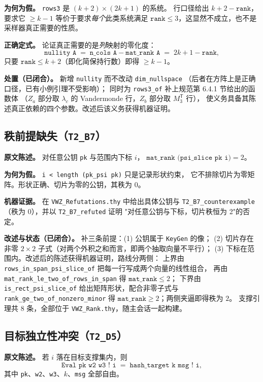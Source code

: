 \documentclass[UTF8,fontset=windows,zihao=-4,a4paper]{ctexart}
\newcommand{\code}[1]{\texttt{#1}}
\begin{document}
\textbf{为何为假。} \code{rows3} 是 $(k+2)\times(2k+1)$ 的系统。
行口径给出 $k+2-\code{rank}$，要求它 $\ge k-1$ 等价于要求\emph{每个}此类系统满足
$\code{rank} \le 3$，这显然不成立，也不是采样器真正需要的性质。

\textbf{正确定式。} 论证真正需要的是\emph{列}映射的零化度：
\begin{equation*}
  \code{nullity A} \;=\; \code{n\_cols A} - \code{mat\_rank A} \;=\; 2k+1-\code{rank},
\end{equation*}
只要 $\code{rank} \le k+2$（即化简保持行数）即得 $\ge k-1$。

\textbf{处置（已闭合）。} 新增 \code{nullity} 而不改动 \code{dim\_nullspace}
（后者在方阵上是正确口径，已有小例引理不受影响）；
同时为 \code{rows3\_of} 补上规范第 6.4.1 节给出的函数体
（$Z_a$ 部分取 $\lambda_c$ 的 Vandermonde 行，$Z_b$ 部分取 $M_3^{\mathsf T}$ 行），
使义务具备其陈述真正依赖的四个参数。改述后该义务获得机器证明。

\subsection{秩前提缺失（\code{T2\_B7}）}
\textbf{原文陈述。} 对任意公钥 \code{pk} 与范围内下标 $i$，
$\code{mat\_rank (psi\_slice pk i)} = 2$。

\textbf{为何为假。} \code{i < length (pk\_psi pk)} 只是记录形状约束，
它不排除切片为零矩阵。形状正确、切片为零的公钥，其秩为 $0$。

\textbf{机器证据。} 在 \code{VWZ\_Refutations.thy} 中给出具体公钥与
\code{T2\_B7\_}\allowbreak\code{counterexample}（秩为 $0$），并以 \code{T2\_B7\_refuted} 证明
"对任意公钥与下标，切片秩恒为 2"的否定。

\textbf{改述与状态（已闭合）。} 补三条前提：(1) 公钥属于 \code{KeyGen} 的像；
(2) 切片存在非零 $2\times 2$ 子式（对两个外积之和而言，即两个抽取向量不平行）；
(3) 下标在范围内。改述后的陈述获得机器证明，路线分两侧：
上界由 \code{rows\_in\_span\_psi\_slice\_of} 把每一行写成两个向量的线性组合，
再由 \code{mat\_rank\_le\_two\_of\_rows\_in\_span} 得 $\code{mat\_rank}\le 2$；
下界由 \code{is\_rect\_psi\_slice\_of} 给出矩阵形状，配合非零子式与
\code{rank\_ge\_two\_of\_nonzero\_minor} 得 $\code{mat\_rank}\ge 2$；两侧夹逼即得秩为 $2$。
支撑引理共 8 条，全部位于 \code{VWZ\_Rank.thy}，随主会话一起构建。

\subsection{目标独立性冲突（\code{T2\_D5}）}
\textbf{原文陈述。} 若 $i$ 落在目标支撑集内，则
\begin{equation*}
  \code{Eval pk w2 w3 ! i} \;=\; \code{hash\_target k msg ! i},
\end{equation*}
其中 \code{pk}、\code{w2}、\code{w3}、$k$、\code{msg} 全部自由。
\end{document}
